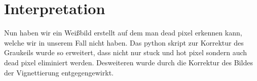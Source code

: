 \documentclass[TGAI_Laborbericht.tex]{subfiles}
\begin{document}
\section{Interpretation}
\label{chap:VERSUCH_3_INTERPRETATION}

Nun haben wir ein Weißbild erstellt auf dem man dead pixel erkennen kann, welche wir in unserem Fall nicht haben. Das python skript  zur Korrektur des Graukeils wurde so erweitert, dass nicht nur stuck und hot pixel sondern auch dead pixel eliminiert werden. Desweiteren wurde durch die Korrektur des Bildes der Vignettierung entgegengewirkt.
\end{document}
